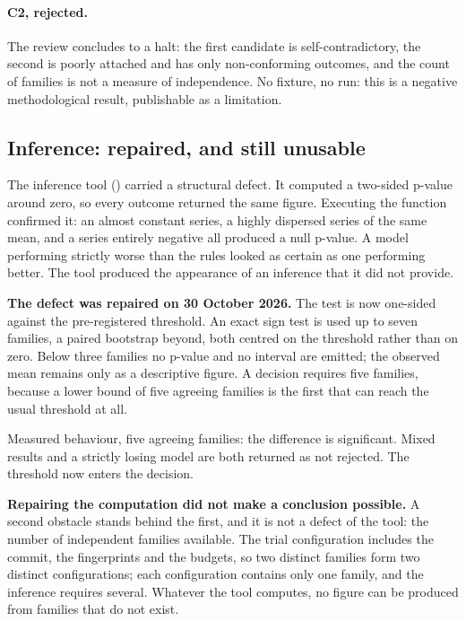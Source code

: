 \paragraph{C2, rejected.} The review concludes to a halt: the first candidate is
self-contradictory, the second is poorly attached and has only non-conforming
outcomes, and the count of families is not a measure of independence. No fixture,
no run: this is a negative methodological result, publishable as a limitation.

\subsection{Inference: repaired, and still unusable}

The inference tool () carried a structural
defect. It computed a two-sided p-value around zero, so every outcome returned
the same figure. Executing the function confirmed it: an almost constant series,
a highly dispersed series of the same mean, and a series entirely negative all
produced a null p-value. A model performing strictly worse than the rules looked
as certain as one performing better. The tool produced the appearance of an
inference that it did not provide.

\textbf{The defect was repaired on 30 October 2026.} The test is now one-sided
against the pre-registered threshold. An exact sign test is used up to seven
families, a paired bootstrap beyond, both centred on the threshold rather than
on zero. Below three families no p-value and no interval are emitted; the
observed mean remains only as a descriptive figure. A decision requires five
families, because a lower bound of five agreeing families is the first that can
reach the usual threshold at all.

Measured behaviour, five agreeing families: the difference is significant.
Mixed results and a strictly losing model are both returned as not rejected.
The threshold now enters the decision.

\textbf{Repairing the computation did not make a conclusion possible.} A second
obstacle stands behind the first, and it is not a defect of the tool: the number
of independent families available. The trial configuration includes the commit,
the fingerprints and the budgets, so two distinct families form two distinct
configurations; each configuration contains only one family, and the inference
requires several. Whatever the tool computes, no figure can be produced from
families that do not exist.

